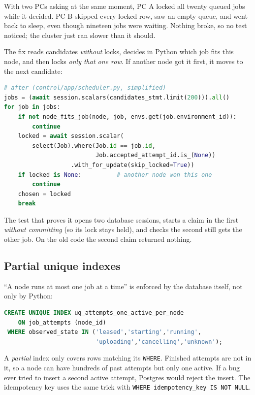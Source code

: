 With two PCs asking at the same moment, PC A locked all twenty queued jobs
while it decided. PC B skipped every locked row, saw an empty queue, and went
back to sleep, even though nineteen jobs were waiting. Nothing broke, so no
test noticed; the cluster just ran slower than it should.

The fix reads candidates \emph{without} locks, decides in Python which job
fits this node, and then locks \emph{only that one row}. If another node got it
first, it moves to the next candidate:

\begin{lstlisting}[language=Python]
# after (control/app/scheduler.py, simplified)
jobs = (await session.scalars(candidates_stmt.limit(200))).all()
for job in jobs:
    if not node_fits_job(node, job, envs.get(job.environment_id)):
        continue
    locked = await session.scalar(
        select(Job).where(Job.id == job.id,
                          Job.accepted_attempt_id.is_(None))
                   .with_for_update(skip_locked=True))
    if locked is None:          # another node won this one
        continue
    chosen = locked
    break
\end{lstlisting}

The test that proves it opens two database sessions, starts a claim in the
first \emph{without committing} (so its lock stays held), and checks the second
still gets the other job. On the old code the second claim returned nothing.

\subsection{Partial unique indexes}

``A node runs at most one job at a time'' is enforced by the database itself,
not only by Python:

\begin{lstlisting}[language=SQL]
CREATE UNIQUE INDEX uq_attempts_one_active_per_node
    ON job_attempts (node_id)
 WHERE observed_state IN ('leased','starting','running',
                          'uploading','cancelling','unknown');
\end{lstlisting}

A \emph{partial} index only covers rows matching its \texttt{WHERE}. Finished
attempts are not in it, so a node can have hundreds of past attempts but only
one active. If a bug ever tried to insert a second active attempt, Postgres
would reject the insert. The idempotency key uses the same trick with
\texttt{WHERE idempotency\_key IS NOT NULL}.

